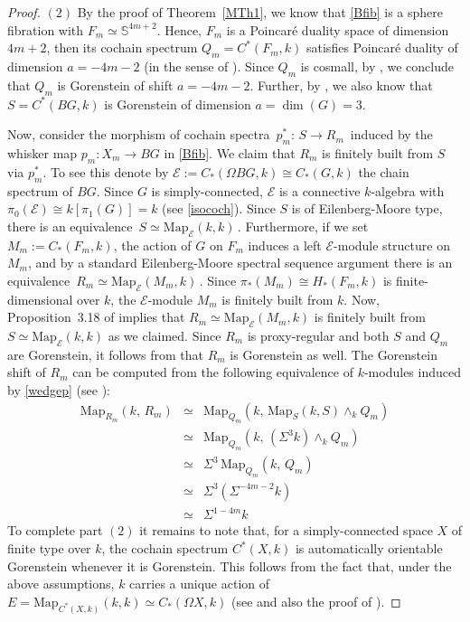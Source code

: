 \documentclass[11pt]{amsart}
\theoremstyle{definition}
\theoremstyle{remark}
\numberwithin{equation}{section}
\newcommand{\Map}{\mathrm{Map}}
\def\bS{\mathbb S}
\def\E{\mathcal{E}}
\begin{document}
\begin{proof}
$(2)$ By the proof of Theorem~\ref{MTh1}, we know that \eqref{Bfib} is a sphere fibration with $ F_m \simeq \bS^{4m+2} $. Hence, $F_m$ is a Poincar\'e duality space of dimension $ 4m+2 $, then its cochain
spectrum $ Q_m = C^*(F_m, k) $ satisfies Poincar\'e duality of dimension $ a = - 4m - 2 $ (in the sense
of \cite[8.11]{DGI06}). Since $ Q_m $ is cosmall, by \cite[Prop. 8.12]{DGI06},  we conclude  that
$ Q_m $ is Gorenstein of shift $ a = -4m-2$. Further, by \cite[10.2]{DGI06}, we also know that
$ S = C^*(BG,k)$ is Gorenstein of dimension $ a = \dim(G) = 3 $. 

Now, consider the morphism of cochain spectra $\, p_m^*: \, S \to R_m \,$ induced by the 
whisker map $ p_m: X_m \to BG $ in \eqref{Bfib}. We claim that $R_m$ is finitely built from $S$ via $ p_m^* $.
To see this denote by $ \E := C_*(\Omega BG, k) \cong C_*(G,k) $ the chain spectrum of $BG$. Since
$G$ is simply-connected, $\E$ is a connective $k$-algebra with $ \pi_0(\E) \cong k[\pi_1(G)] = k $
(see \eqref{isococh}). Since $S$ is of Eilenberg-Moore type, there is an equivalence $\, 
S \simeq \Map_{\E}(k,k) \,$. Furthermore, if we set $ M_m := C_*(F_m, k) $, the action of $G$ on $F_m$ 
induces a left $ \E$-module structure on $ M_m $, and by a standard Eilenberg-Moore spectral sequence argument
there is an equivalence $\,R_m \simeq \Map_{\E}(M_m, k)\,$. Since $ \pi_*(M_m) \cong H_*(F_m, k) $ is 
finite-dimensional over $k$, the $ \E$-module $M_m$ is finitely built from $k$. Now, Proposition~3.18 of \cite{DGI06} implies that $R_m \simeq \Map_{\E}(M_m, k) $ is finitely built from $ S \simeq \Map_{\E}(k,k) $ as we claimed. Since $ R_m $ is proxy-regular and both $ S $ and $ Q_m $ are Gorenstein, it follows from
\cite[Prop. 8.10]{DGI06} that $ R_m $ is Gorenstein as well. The Gorenstein shift of $R_m$ can be 
computed from the following equivalence of $k$-modules induced by \eqref{wedgep} (see \cite[Prop. 8.6]{DGI06}):
%
\begin{eqnarray*}
\Map_{R_m}(k, \,R_m) &\simeq & \Map_{Q_m}(k, \,\Map_{S}(k, S) \wedge_{k} Q_m)\\
&\simeq& \Map_{Q_m}(k,\, (\Sigma^3 k) \wedge_{k} Q_m)\\
&\simeq& \Sigma^3\, \Map_{Q_m}(k, \,Q_m)\\
&\simeq& \Sigma^3 (\Sigma^{-4m-2} k) \\
&\simeq& \Sigma^{1-4m} k
\end{eqnarray*}
%
To complete part $(2)$ it remains to note that, for a simply-connected space $X$ of finite type
over $k$, the cochain spectrum $ C^*(X, k) $ is automatically orientable Gorenstein whenever it is 
Gorenstein. This follows from the fact that, under the above assumptions, $k$ carries a unique action of $ E = \Map_{C^*(X,k)}(k,k) \simeq C_*(\Omega X, k)$ (see \cite[Sect. 18.3]{G18} and also the proof of \cite[Lemma 3.8]{BCHV21}).


\end{proof}
\end{document}
